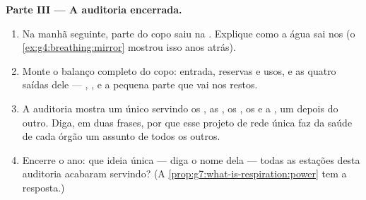 \begin{problem}
\medskip\noindent\textbf{Parte III --- A auditoria encerrada.}
\begin{enumerate}[resume]
  \item Na manhã seguinte, parte do copo saiu na . Explique
        como a água sai nos  (o
        \cref{ex:g4:breathing:mirror} mostrou isso anos atrás).
  \item Monte o balanço completo do copo: entrada, reservas e usos, e
        as quatro saídas dele --- , ,  e a
        pequena parte que vai nos restos.
  \item A auditoria mostra um único  servindo os , as
        , os , os  e a , um depois do
        outro. Diga, em duas frases, por que esse projeto de rede
        única faz da saúde de cada órgão um assunto de todos os
        outros.
  \item Encerre o ano: que ideia única --- diga o nome dela --- todas
        as estações desta auditoria acabaram servindo? (A
        \cref{prop:g7:what-is-respiration:power} tem a resposta.)
\end{enumerate}
\end{problem}
